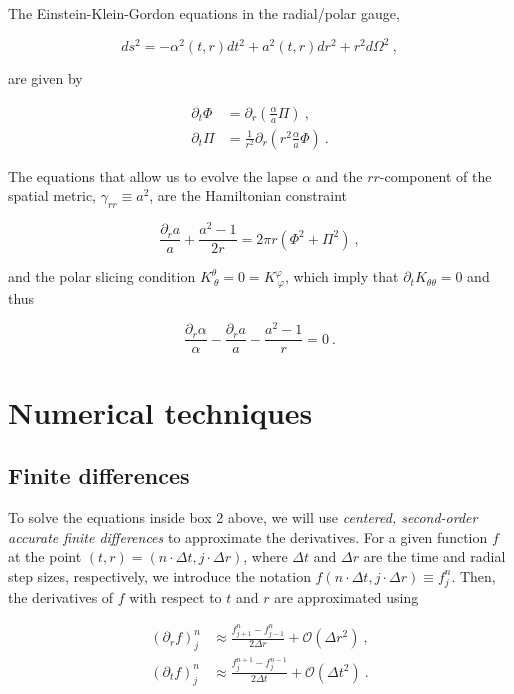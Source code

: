 \documentclass[a4paper,11pt]{article}
\renewcommand{\a}{\alpha}
\newcommand{\g}{\gamma}
\newcommand{\gDD}[2]{\g_{{#1}{#2}}}
\newcommand{\pd}{\partial}
\newcommand{\nn}{\nonumber}
\newcommand{\dt}{\Delta t}
\newcommand{\dr}{\Delta r}
\newcommand{\order}[2]{\mathcal{O}\lrpar{#1^{#2}}}
\newcommand{\lrpar}[1]{\left( #1 \right)}
\newcommand{\n}{\noindent}
\newcommand{\eq}[1]{
  \begin{equation}
    #1
  \end{equation}
}
\newcommand{\spl}[1]{
  \begin{split}
    #1
  \end{split}
}
\newcommand{\al}[1]{
  \begin{align}
    #1
  \end{align}
}
\newcommand{\parboxbreak}[2]{
  
  \vspace*{0.25in}
  
  \begin{tcolorbox}[breakable, pad at break=1mm, before=\centering,title=Box #1,colback=blue!5!white,colframe=gray!75!black]
    #2
  \end{tcolorbox}

  \vspace*{0.25in}

}
\begin{document}
\parboxbreak{2: The EKG+ADM equations in the radial/polar gauge}{

  The Einstein-Klein-Gordon equations in the radial/polar gauge,

  \eq{ ds^{2} = -\a^{2}\lrpar{t,r}dt^{2} + a^{2}\lrpar{t,r}dr^{2} + r^{2}d\Omega^{2}\ , \nn}

  \n are given by

  \al{
    \pd_{t}\Phi &= \pd_{r}\lrpar{\frac{\a}{a}\Pi}\ ,\nn\\
    \pd_{t}\Pi  &= \frac{1}{r^{2}}\pd_{r}\lrpar{r^{2}\frac{\a}{a}\Phi}\ . \nn
  }

  \n The equations that allow us to evolve the lapse $\a$ and the $rr$-component of the spatial metric, $\gDD{r}{r} \equiv a^{2}$, are the Hamiltonian constraint

  \eq{ \frac{\pd_{r}a}{a} + \frac{a^{2}-1}{2r} = 2\pi r\lrpar{\Phi^{2} + \Pi^{2}}\ , \nn }

  \n and the polar slicing condition $K^{\theta}_{\ \theta} = 0 = K^{\varphi}_{\ \varphi}$, which imply that $\pd_{t}K_{\theta\theta} = 0$ and thus

  \eq{ \frac{\pd_{r}\a}{\a} - \frac{\pd_{r}a}{a} - \frac{a^{2}-1}{r} = 0\ . \nn}
  
}

\section{Numerical techniques}

\subsection{Finite differences}

\begin{sloppypar}
To solve the equations inside box 2 above, we will use \emph{centered, second-order accurate finite differences} to approximate the derivatives. For a given function $f$ at the point ${(t,r)=(n\cdot\dt,j\cdot\dr)}$, where $\dt$ and $\dr$ are the time and radial step sizes, respectively, we introduce the notation $f(n\cdot\dt,j\cdot\dr) \equiv f^{n}_{j}$. Then, the derivatives of $f$ with respect to $t$ and $r$ are approximated using
\end{sloppypar}

\eq{
  \spl{
    \lrpar{\pd_{r}f}^{n}_{j} &\approx \frac{f^{n}_{j+1} - f^{n}_{j-1}}{2\dr} + \order{\dr}{2}\ ,\\
    \lrpar{\pd_{t}f}^{n}_{j} &\approx \frac{f^{n+1}_{j} - f^{n-1}_{j}}{2\dt} + \order{\dt}{2}\ .
  }
}
\end{document}
